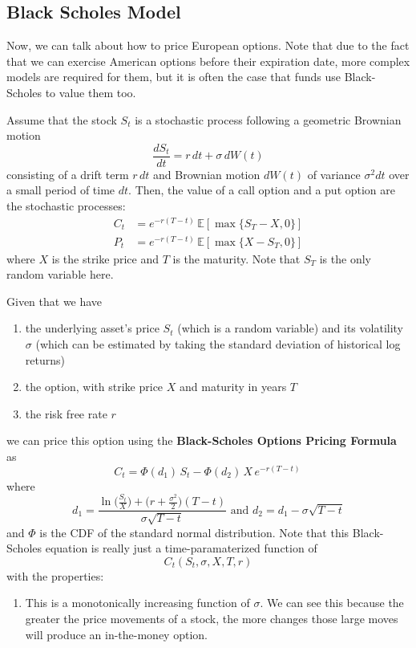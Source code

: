 \documentclass{article}
\begin{document}
\subsection{Black Scholes Model}

Now, we can talk about how to price European options. Note that due to the fact that we can exercise American options before their expiration date, more complex models are required for them, but it is often the case that funds use Black-Scholes to value them too. 

\begin{definition}
Assume that the stock $S_t$ is a stochastic process following a geometric Brownian motion 
\[\frac{d S_t}{d t} = r \, dt + \sigma \, dW(t)\]
consisting of a drift term $r \,dt$ and Brownian motion $dW(t)$ of variance $\sigma^2 dt$ over a small period of time $dt$. Then, the value of a call option and a put option are the stochastic processes: 
\begin{align*}
    C_t & = e^{-r (T - t)} \, \mathbb{E}[\max\{S_T - X, 0\}] \\
    P_t & = e^{-r (T - t)} \, \mathbb{E}[\max\{X - S_T, 0\}]
\end{align*}
where $X$ is the strike price and $T$ is the maturity. Note that $S_T$ is the only random variable here.
\end{definition}

\begin{definition}
Given that we have 
\begin{enumerate}
    \item the underlying asset's price $S_t$ (which is a random variable) and its volatility $\sigma$ (which can be estimated by taking the standard deviation of historical log returns)
    \item the option, with strike price $X$ and maturity in years $T$ 
    \item the risk free rate $r$ 
\end{enumerate}
we can price this option using the \textbf{Black-Scholes Options Pricing Formula} as 
\[C_t = \Phi (d_1) \, S_t - \Phi(d_2) \, X \, e^{-r (T - t)}\,\]
where 
\[d_1 = \frac{ \ln \big(\frac{S_t}{X} \big) + \big( r + \frac{\sigma^2}{2} \big) (T - t)}{\sigma \sqrt{T - t}} \text{ and } d_2 = d_1 - \sigma \sqrt{T - t}\]
and $\Phi$ is the CDF of the standard normal distribution. Note that this Black-Scholes equation is really just a time-paramaterized function of 
\[C_t ( S_t, \sigma, X, T, r)\]
with the properties: 
\begin{enumerate}
    \item This is a monotonically increasing function of $\sigma$. We can see this because the greater the price movements of a stock, the more changes those large moves will produce an in-the-money option. 
\end{enumerate}
\end{definition}
\end{document}
